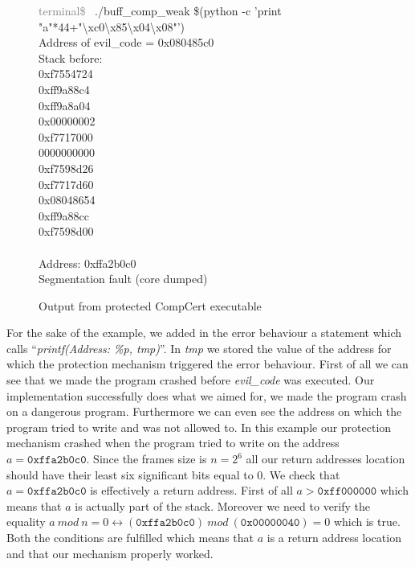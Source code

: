 \documentclass[11pt]{sdm}
\begin{document}
\begin{figure}[!ht]
\textcolor{gray}{terminal\$~} ./buff\_comp\_weak \$(python -c 'print "a"*44+"\textbackslash{xc0}\textbackslash{x85}\textbackslash{x04}\textbackslash{x08}"')\\
Address of evil\_code = 0x080485c0\\

Stack before:       \\
0xf7554724          \\
0xff9a88c4          \\
0xff9a8a04          \\
0x00000002          \\
0xf7717000          \\
0000000000          \\
0xf7598d26          \\
0xf7717d60          \\
0x08048654          \\
0xff9a88cc          \\
0xf7598d00          \\
                    \\
Address: 0xffa2b0c0 \\
Segmentation fault (core dumped)
\caption{Output from protected CompCert executable}
\label{output_protected}
\end{figure}

For the sake of the example, we added in the error behaviour a statement which calls  ``\textit{printf(Address: \%p, tmp)}''. In \textit{tmp} we stored the value of the address for which the protection mechanism triggered the error behaviour.
First of all we can see that we made the program crashed before \textit{evil\_code} was executed. Our implementation successfully does what we aimed for, we made the program crash on a dangerous program.
Furthermore we can even see the address on which the program tried to write and was not allowed to. In this example our protection mechanism crashed when the program tried to write on the address $a=\texttt{0xffa2b0c0}$. 
Since the frames size is $n=2^6$ all our return addresses location should have their least six significant bits equal to 0.
We check that $a=\texttt{0xffa2b0c0}$ is effectively a return address. First of all $a>\texttt{0xff000000}$ which means that $a$ is actually part of the stack. Moreover we need to verify the equality $a~mod~n=0 \leftrightarrow (\texttt{0xffa2b0c0})~mod~(\texttt{0x00000040}) = 0$ which is true. 
Both the conditions are fulfilled which means that $a$ is a return address location and that our mechanism properly worked.
\end{document}
